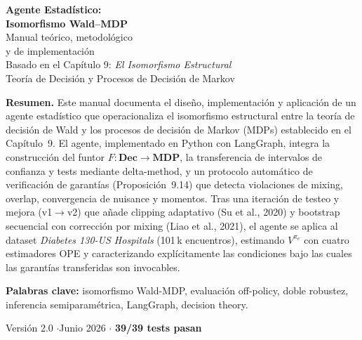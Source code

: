 \documentclass[11pt,a4paper]{article}
\theoremstyle{mitheorem}
\theoremstyle{mitdef}
\begin{document}
\begin{titlepage}
\centering
\vspace*{2cm}
{\sffamily\Huge\bfseries\color{mitprimary}
Agente Estadístico:\\[0.3em]
Isomorfismo Wald--MDP}\\[0.5em]
{\sffamily\Large\color{mitaccent}Manual teórico, metodológico\\
y de implementación}\\[2cm]

{\sffamily\large
Basado en el Capítulo 9: \textit{El Isomorfismo Estructural}\\
Teoría de Decisión y Procesos de Decisión de Markov}\\[2cm]

\begin{tcolorbox}[enhanced, colback=mitlight, colframe=mitprimary,
                   boxrule=0.6pt, arc=2pt, width=0.85\textwidth,
                   left=12pt, right=12pt, top=8pt, bottom=8pt]
\sffamily\textbf{\color{mitprimary}Resumen.}\normalfont
Este manual documenta el diseño, implementación y aplicación de un
agente estadístico que operacionaliza el isomorfismo estructural entre
la teoría de decisión de Wald y los procesos de decisión de Markov
(MDPs) establecido en el Capítulo~9. El agente, implementado en
Python con LangGraph, integra la construcción del funtor
$F:\mathbf{Dec}\to\mathbf{MDP}$, la transferencia de intervalos de
confianza y tests mediante delta-method, y un protocolo automático
de verificación de garantías (Proposición~9.14) que detecta
violaciones de mixing, overlap, convergencia de nuisance y momentos.
Tras una iteración de testeo y mejora (v1$\to$v2) que añade
clipping adaptativo (Su et al., 2020) y bootstrap secuencial con
corrección por mixing (Liao et al., 2021), el agente se aplica al
dataset \textit{Diabetes 130-US Hospitals} (101\,k encuentros),
estimando $V^{\pi_e}$ con cuatro estimadores OPE y caracterizando
explícitamente las condiciones bajo las cuales las garantías
transferidas son invocables.

\vspace{0.5em}
\textbf{\color{mitprimary}Palabras clave:} isomorfismo Wald-MDP,
evaluación off-policy, doble robustez, inferencia semiparamétrica,
LangGraph, decision theory.
\end{tcolorbox}

\vfill
{\sffamily\small
Versión 2.0 \quad$\cdot$\quad Junio 2026 \quad$\cdot$\quad
\textbf{39/39 tests pasan}}
\end{titlepage}
\end{document}
